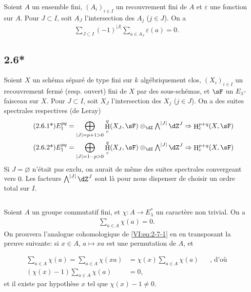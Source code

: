 \documentclass[oneside]{book}
\DeclareMathOperator{\h}{H}
\theoremstyle{sga-source}
\theoremstyle{sga-source-dash}
\theoremstyle{sga-source-dotdash}
\theoremstyle{sga-source-number-note-dash}
\theoremstyle{sga-source-note-number-dotdash}
\theoremstyle{sga-source-example-dotdash}
\theoremstyle{sga-source-inline-number}
\theoremstyle{sga-source-bare-number}
\theoremstyle{sga-source}
\newcommand{\PrintPage}[1]{}\newcommand{\MathPage}[1]{}\newcommand{\PrintCite}[2]{#1}\newcommand{\var}[3]{#2}
\begin{document}
Soient $A$ un ensemble fini, $(A_i)_{i\in I}$ un recouvrement fini de $A$ et 
$\varepsilon$ une fonction sur $A$. Pour $J\subset I$, soit $A_J$ 
l'intersection des $A_j$ ($j\in J$). On a 
\begin{align*}\tag{2.6.1}\label{VI:eq:2-6-1}
  \sum_{J\subset I} (-1)^{|J|} \sum_{a\in A_J} \varepsilon(a) = 0 \text{.}
\end{align*}





\subsection*{2.6*}\label{VI:2-6*}

Soient $X$ un schéma séparé de type fini sur $k$ algébriquement clos, 
$(X_i)_{i\in I}$ un recouvrement fermé (resp. ouvert) fini de $X$ par des 
sous-schémas, et $\sF$ un $E_\lambda$-faisceau sur $X$. Pour $J\subset I$, 
soit $X_J$ l'intersection des $X_j$ ($j\in J$). On a des suites spectrales 
respectives (de Leray) 
\begin{align*}\tag{2.6.1*}\label{VI:eq:2-6-1*}
  E_1^{p q} &= \bigoplus_{|J|=p+1>0} \h_c^q(X_J,\sF) \otimes_\dZ \textstyle\bigwedge^{|J|} \dZ^J \Rightarrow \h_c^{p+q}(X,\sF) \\ 
  \tag{2.6.2*}\label{VI:eq:2-6-2*}
  E_1^{p q} &= \bigoplus_{|J|=1-p>0} \h_c^q(X_J,\sF) \otimes_\dZ \textstyle\bigwedge^{|J|} \dZ^J \Rightarrow \h_c^{p+q}(X,\sF)
\end{align*}
Si $J=\varnothing$ \var{n'était pas exclus}{n'était pas exclu}{S45-SOL-0745}, on aurait de même des suites 
spectrales convergeant vers $0$. Les facteurs $\bigwedge^{|J|} \dZ^J$ sont là 
pour nous dispenser de choisir un ordre total sur $I$. 





\subsection{}\label{VI:2-7}

Soient $A$ un groupe commutatif fini, et $\chi:A \to E_\lambda^\ast$ un 
caractère non trivial. On a 
\begin{align*}\tag{2.7.1}\label{VI:eq:2-7-1}
  \sum_{a\in A} \chi(a) = 0 \text{.}
\end{align*}
On prouvera l'analogue cohomologique de \eqref{VI:eq:2-7-1} en en transposant 
la preuve suivante: si $x\in A$, $a\mapsto x a$ est une permutation de $A$, et 
\PrintPage{187}
\begin{align*}
  \sum_{a\in A}\chi(a) = \sum_{a\in A} \chi(x a) &= \chi(x) \sum_{a\in A} \chi(a) && \text{, d'où} \\
  (\chi(x)-1)\sum_{a\in A}\chi(a) &= 0 \text{,}
\end{align*}
et il existe par hypothèse $x$ tel que $\chi(x)-1\ne 0$. 
\end{document}
